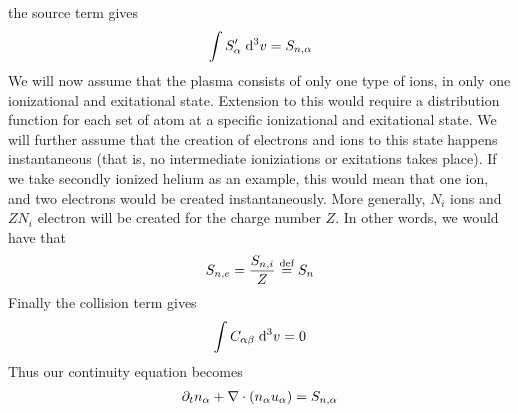 %
the source term gives
%
\begin{align*}
    \int {S'_{\alpha}} \; \text{d} {^3v} = S_{n,\alpha}
\end{align*}
%
We will now assume that the plasma consists of only one type of ions, in only one ionizational and exitational state.
Extension to this would require a distribution function for each set of atom at a specific ionizational and exitational state.
We will further assume that the creation of electrons and ions to this state happens instantaneous (that is, no intermediate ioniziations or exitations takes place).
If we take secondly ionized helium as an example, this would mean that one ion, and two electrons would be created instantaneously.
More generally, $N_i$ ions and $ZN_i$ electron will be created for the charge number $Z$.
In other words, we would have that
%
\begin{align}
S_{n,e}=\frac{S_{n,i}}{Z}\overset{\text{def}}{=} S_n
\label{eq:kinSource}
\end{align}
%
Finally the collision term gives
%
\begin{align*}
    \int {C_{\alpha\beta}} \; \text{d} {^3v} = 0
\end{align*}
%
Thus our continuity equation becomes
%
\begin{align}
    \partial_t n_\alpha + \nabla\cdot\left(n_\alpha u_\alpha\right) = S_{n,\alpha} \label{kin:cont}
\end{align}

